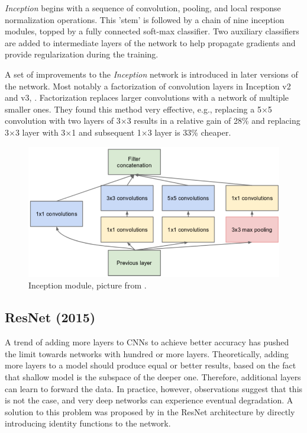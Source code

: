 \textit{Inception} begins with a sequence of convolution, pooling, and local response normalization operations. This 'stem' is followed by a chain of nine inception modules, topped by a fully connected soft-max classifier. Two auxiliary classifiers are added to intermediate layers of the network to help propagate gradients and provide regularization during the training.

A set of improvements to the \textit{Inception} network is introduced in later versions of the network. Most notably a factorization of convolution layers in Inception v2 and v3, \citeauthor{bib:inception2} \cite{bib:inception2}. Factorization replaces larger convolutions with a network of multiple smaller ones. They found this method very effective, e.g., replacing a 5$\times$5 convolution with two layers of 3$\times$3 results in a relative gain of 28\% and replacing 3$\times$3 layer with 3$\times$1 and subsequent 1$\times$3 layer is 33\% cheaper.

\begin{figure}
    \includegraphics[width=\textwidth]{img/inception}
    \caption[Inception module]%
    {Inception module, picture from \cite[figure 2]{bib:googlenet}.}
    \label{fig:incept_mod}
\end{figure}

\subsection{ResNet (2015)}
\label{sec:resnet}
A trend of adding more layers to CNNs to achieve better accuracy has pushed the limit towards networks with hundred or more layers.  Theoretically, adding more layers to a model should produce equal or better results, based on the fact that shallow model is the subspace of the deeper one. Therefore, additional layers can learn to forward the data. In practice, however, observations suggest that this is not the case, and very deep networks can experience eventual degradation. A solution to this problem was proposed by \citeauthor{bib:resnet} \cite{bib:resnet} in the ResNet architecture by directly introducing identity functions to the network.

